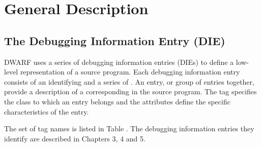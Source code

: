 \chapter{General Description}
\label{chap:generaldescription}
\section{The Debugging Information Entry (DIE)}
\label{chap:thedebuggingentrydie}
DWARF
uses a series of debugging information entries
(DIEs)
to define a low-level representation of a source program.
Each debugging information entry consists of an identifying
 and a series of
.
An entry, or group of entries together, provide a description of a
corresponding
 in the source program.
The tag specifies the class to which an entry belongs
and the attributes define the specific characteristics of the entry.

The set of tag names
is listed in Table .
The debugging information entries they identify are
described in Chapters 3, 4 and 5.

\begin{table}[p]
\caption{Tag names}
\label{tab:tagnames}
\simplerule[6in]
\simplerule[6in]
\end{table}


